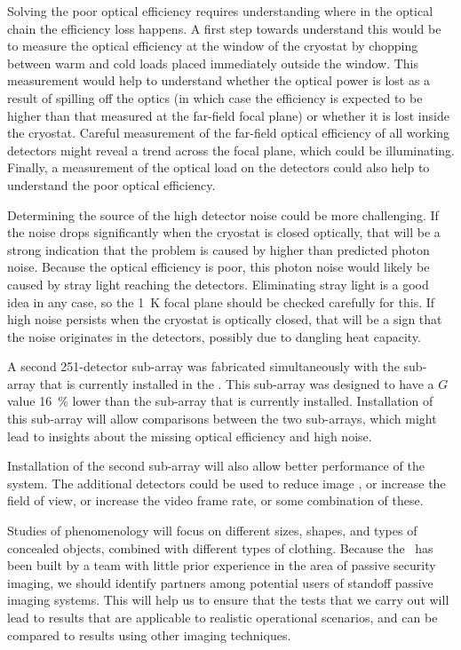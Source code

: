 Solving the poor optical efficiency requires understanding where in the optical chain the efficiency loss happens.
A first step towards understand this would be to measure the optical efficiency at the window of the cryostat by chopping between warm and cold loads placed immediately outside the window.
This measurement would help to understand whether the optical power is lost as a result of spilling off the optics (in which case the efficiency is expected to be higher than that measured at the far-field focal plane) or whether it is lost inside the cryostat.
Careful measurement of the far-field optical efficiency of all working detectors might reveal a trend across the focal plane, which could be illuminating.
Finally, a measurement of the optical load on the detectors could also help to understand the poor optical efficiency.

Determining the source of the high detector noise could be more challenging.
If the noise drops significantly when the cryostat is closed optically, that will be a strong indication that the problem is caused by higher than predicted photon noise.
Because the optical efficiency is poor, this photon noise would likely be caused by stray light reaching the detectors.
Eliminating stray light is a good idea in any case, so the \SI{1}{\K} focal plane should be checked carefully for this.
If high noise persists when the cryostat is optically closed, that will be a sign that the noise originates in the detectors, possibly due to dangling heat capacity.

A second 251-detector sub-array was fabricated simultaneously with the sub-array that is currently installed in the \Imager.
This sub-array was designed to have a $G$ value \SI{16}{\percent} lower than the sub-array that is currently installed.
Installation of this sub-array will allow comparisons between the two sub-arrays, which might lead to insights about the missing optical efficiency and high noise.


Installation of the second sub-array will also allow better performance of the system.
The additional detectors could be used to reduce image \NETD, or increase the field of view, or increase the video frame rate, or some combination of these.

Studies of phenomenology will focus on different sizes, shapes, and types of concealed objects, combined with different types of clothing.
Because the \Imager\ has been built by a team with little prior experience in the area of passive security imaging, we should identify partners among potential users of standoff passive imaging systems.
This will help us to ensure that the tests that we carry out will lead to results that are applicable to realistic operational scenarios, and can be compared to results using other imaging techniques.

